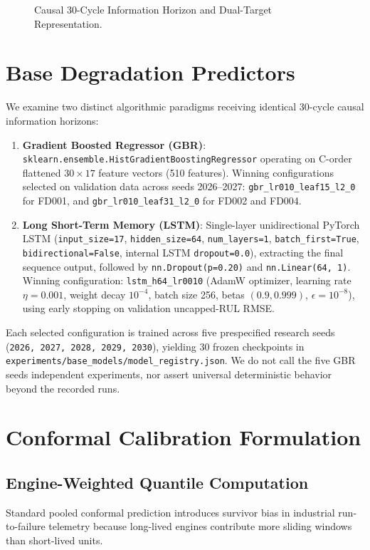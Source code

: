 \begin{figure}[htbp]
\centering

\caption{Causal 30-Cycle Information Horizon and Dual-Target Representation.}
\label{fig:thesis_causal_window}
\end{figure}

\section{Base Degradation Predictors}
We examine two distinct algorithmic paradigms receiving identical 30-cycle causal information horizons:
\begin{enumerate}
    \item \textbf{Gradient Boosted Regressor (GBR)}: \texttt{sklearn.ensemble.HistGradientBoostingRegressor} operating on C-order flattened $30 \times 17$ feature vectors (510 features). Winning configurations selected on validation data across seeds 2026--2027: \texttt{gbr\_lr010\_leaf15\_l2\_0} for FD001, and \texttt{gbr\_lr010\_leaf31\_l2\_0} for FD002 and FD004.
    \item \textbf{Long Short-Term Memory (LSTM)}: Single-layer unidirectional PyTorch LSTM (\texttt{input\_size=17}, \texttt{hidden\_size=64}, \texttt{num\_layers=1}, \texttt{batch\_first=True}, \texttt{bidirectional=False}, internal LSTM \texttt{dropout=0.0}), extracting the final sequence output, followed by \texttt{nn.Dropout(p=0.20)} and \texttt{nn.Linear(64, 1)}. Winning configuration: \texttt{lstm\_h64\_lr0010} (AdamW optimizer, learning rate $\eta = 0.001$, weight decay $10^{-4}$, batch size 256, betas $(0.9, 0.999)$, $\epsilon = 10^{-8}$), using early stopping on validation uncapped-RUL RMSE.
\end{enumerate}
Each selected configuration is trained across five prespecified research seeds (\texttt{2026, 2027, 2028, 2029, 2030}), yielding 30 frozen checkpoints in \texttt{experiments/base\_models/model\_registry.json}. We do not call the five GBR seeds independent experiments, nor assert universal deterministic behavior beyond the recorded runs.

\section{Conformal Calibration Formulation}
\subsection{Engine-Weighted Quantile Computation}
Standard pooled conformal prediction introduces survivor bias in industrial run-to-failure telemetry because long-lived engines contribute more sliding windows than short-lived units.

